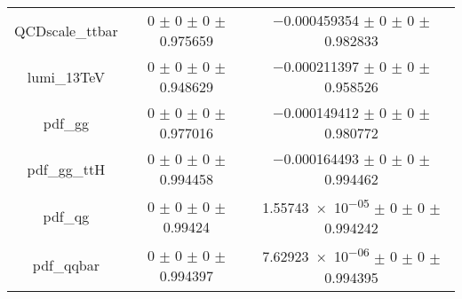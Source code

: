 \begin{table}
\begin{tabular}{ccc}
QCDscale\_ttbar & \num{0} $\pm$ \num{0} $\pm$ \num{0} $\pm$ \num{0.975659} & \num{-0.000459354} $\pm$ \num{0} $\pm$ \num{0} $\pm$ \num{0.982833}\\
lumi\_13TeV & \num{0} $\pm$ \num{0} $\pm$ \num{0} $\pm$ \num{0.948629} & \num{-0.000211397} $\pm$ \num{0} $\pm$ \num{0} $\pm$ \num{0.958526}\\
pdf\_gg & \num{0} $\pm$ \num{0} $\pm$ \num{0} $\pm$ \num{0.977016} & \num{-0.000149412} $\pm$ \num{0} $\pm$ \num{0} $\pm$ \num{0.980772}\\
pdf\_gg\_ttH & \num{0} $\pm$ \num{0} $\pm$ \num{0} $\pm$ \num{0.994458} & \num{-0.000164493} $\pm$ \num{0} $\pm$ \num{0} $\pm$ \num{0.994462}\\
pdf\_qg & \num{0} $\pm$ \num{0} $\pm$ \num{0} $\pm$ \num{0.99424} & \num{1.55743e-05} $\pm$ \num{0} $\pm$ \num{0} $\pm$ \num{0.994242}\\
pdf\_qqbar & \num{0} $\pm$ \num{0} $\pm$ \num{0} $\pm$ \num{0.994397} & \num{7.62923e-06} $\pm$ \num{0} $\pm$ \num{0} $\pm$ \num{0.994395}\\
\bottomrule
\end{tabular}
\end{table}